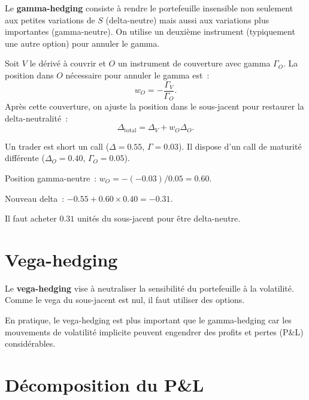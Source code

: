 \begin{definition}
Le \textbf{gamma-hedging} consiste \`a rendre le portefeuille insensible
non seulement aux petites variations de $S$ (delta-neutre) mais aussi
aux variations plus importantes (gamma-neutre). On utilise un deuxi\`eme
instrument (typiquement une autre option) pour annuler le gamma.
\end{definition}

\begin{proposition}
Soit $V$ le d\'eriv\'e \`a couvrir et $O$ un instrument de couverture
avec gamma $\Gamma_O$. La position dans $O$ n\'ecessaire pour annuler
le gamma est~:
\[
    w_O = -\frac{\Gamma_V}{\Gamma_O}.
\]
Apr\`es cette couverture, on ajuste la position dans le sous-jacent pour
restaurer la delta-neutralit\'e~:
\[
    \Delta_{\text{total}} = \Delta_V + w_O \Delta_O.
\]
\end{proposition}

\begin{exemple}
Un trader est short un call ($\Delta = 0.55$, $\Gamma = 0.03$). Il dispose
d'un call de maturit\'e diff\'erente ($\Delta_O = 0.40$, $\Gamma_O = 0.05$).

Position gamma-neutre~: $w_O = -(-0.03)/0.05 = 0.60$.

Nouveau delta~: $-0.55 + 0.60 \times 0.40 = -0.31$.

Il faut acheter $0.31$ unit\'es du sous-jacent pour \^etre delta-neutre.
\end{exemple}

\section{Vega-hedging}

\begin{definition}
Le \textbf{vega-hedging} vise \`a neutraliser la sensibilit\'e du
portefeuille \`a la volatilit\'e. Comme le vega du sous-jacent est nul,
il faut utiliser des options.
\end{definition}

\begin{remarque}
En pratique, le vega-hedging est plus important que le gamma-hedging
car les mouvements de volatilit\'e implicite peuvent engendrer des
profits et pertes (P\&L) consid\'erables.
\end{remarque}

\section{D\'ecomposition du P\&L}

